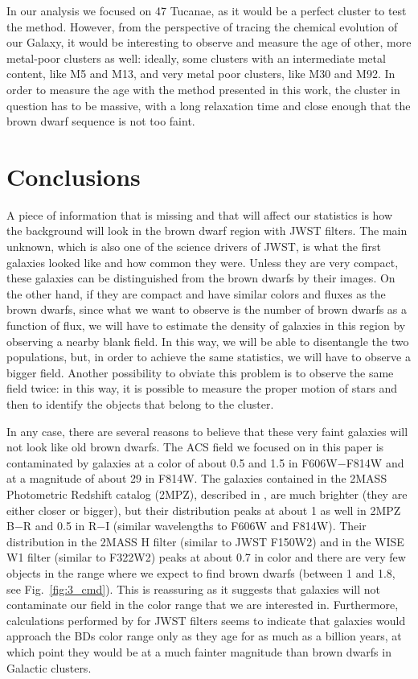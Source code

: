 \documentclass[useAMS,usenatbib]{mnras}
\begin{document}
In our analysis we focused on 47 Tucanae, as it would be a perfect cluster to test the method. However, from the perspective of tracing the chemical evolution of our Galaxy, it would be interesting to observe and measure the age of other, more metal-poor clusters as well: ideally, some clusters with an intermediate metal content, like M5 and M13, and very metal poor clusters, like M30 and M92. In order to measure the age with the method presented in this work, the cluster in question has to be massive, with a long relaxation time and close enough that the brown dwarf sequence is not too faint.

\section{Conclusions}
\label{sec:conclusions}

A piece of information that is missing and that will affect our statistics is how the background will look in the brown dwarf region with JWST filters. The main unknown, which is also one of the science drivers of JWST, is what the first galaxies looked like and how common they were.  Unless they are very compact, these galaxies can be distinguished from the brown dwarfs by their images.  On the other hand, if they are compact and have similar colors and fluxes as the brown dwarfs, since what we want to observe is the number of brown dwarfs as a function of flux, we will have to estimate the density of galaxies in this region by observing a nearby blank field. In this way, we will be able to disentangle the two populations, but, in order to achieve the same statistics, we will have to observe a bigger field. Another possibility to obviate this problem is to observe the same field twice: in this way, it is possible to measure the proper motion of stars and then to identify the objects that belong to the cluster.

In any case, there are several reasons to believe that these very faint galaxies will not look like old brown dwarfs. The ACS field we focused on in this paper is contaminated by galaxies at a color of about 0.5 and 1.5 in F606W$-$F814W and at a magnitude of about 29 in F814W. The galaxies contained in the 2MASS Photometric Redshift catalog (2MPZ), described in \citet{0067-0049-210-1-9}, are much brighter (they are either closer or bigger), but their distribution peaks at about 1 as well in 2MPZ B$-$R and 0.5 in R$-$I (similar wavelengths to F606W and F814W). Their distribution in the 2MASS H filter (similar to JWST F150W2) and in the WISE W1 filter (similar to F322W2) peaks at about 0.7 in color and there are very few objects in the range where we expect to find brown dwarfs (between 1 and 1.8, see Fig.~\ref{fig:3_cmd}). This is reassuring as it suggests that galaxies will not contaminate our field in the color range that we are interested in. Furthermore, calculations performed by \citet{2011ApJ...740...13Z} for JWST filters seems to indicate that galaxies would approach the BDs color range only as they age for as much as a billion years, at which point they would be at a much fainter magnitude than brown dwarfs in Galactic clusters.
\end{document}
